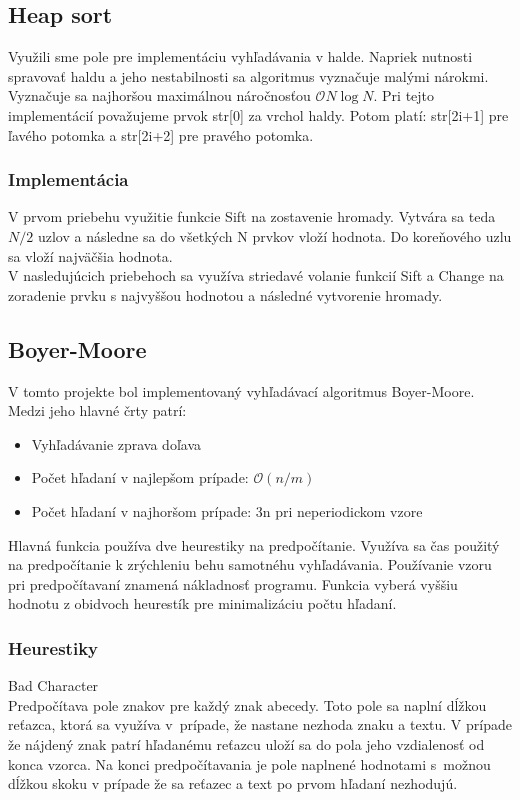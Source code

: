 \documentclass[a4paper]{article}
\begin{document}
\subsection{Heap sort}
Využili sme pole pre implementáciu vyhľadávania v halde. Napriek nutnosti spravovať haldu a jeho nestabilnosti sa algoritmus vyznačuje malými nárokmi. Vyznačuje sa najhoršou maximálnou náročnosťou $\mathcal{O}N\log{N}$.
Pri tejto implementácií považujeme prvok str[0] za vrchol haldy. Potom platí: str[2i+1] pre ľavého potomka a str[2i+2] pre pravého potomka. 
\subsubsection{Implementácia}
V prvom priebehu využitie funkcie Sift na zostavenie hromady. Vytvára sa teda $N / 2$ uzlov a následne sa do všetkých N prvkov vloží hodnota. Do koreňového uzlu sa vloží najväčšia hodnota. \\
V nasledujúcich priebehoch sa využíva striedavé volanie funkcií Sift a Change na zoradenie prvku s najvyššou hodnotou a následné vytvorenie hromady. 
\subsection{Boyer-Moore} 
V tomto projekte bol implementovaný vyhľadávací algoritmus Boyer-Moore. Medzi jeho hlavné črty patrí:
\begin{itemize}
\item{Vyhľadávanie zprava doľava}
\item{Počet hľadaní v najlepšom prípade: $\mathcal{O}(n / m)$}
\item{Počet hľadaní v najhoršom prípade: 3n pri neperiodickom vzore}
\end{itemize}

Hlavná funkcia používa dve heurestiky na predpočítanie. Využíva  sa čas použitý na predpočítanie k zrýchleniu behu samotnéhu vyhľadávania. Používanie vzoru pri predpočítavaní znamená nákladnosť programu. Funkcia vyberá vyššiu hodnotu z obidvoch heurestík pre minimalizáciu počtu hľadaní.

\subsubsection{Heurestiky}
Bad Character\\
Predpočítava pole znakov pre každý znak abecedy. Toto pole sa naplní dĺžkou reťazca, ktorá sa využíva v~prípade, že nastane nezhoda znaku a textu. V prípade že nájdený znak patrí hľadanému reťazcu uloží sa do pola jeho vzdialenosť od konca vzorca. Na konci predpočítavania je pole naplnené hodnotami s~možnou dĺžkou skoku v prípade že sa reťazec a text po prvom hľadaní nezhodujú.
\end{document}
